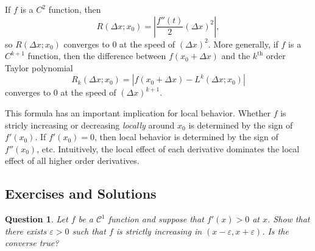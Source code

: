 \documentclass[11pt]{article}
\newtheorem{question}{Question}
\begin{document}
If \(f\) is a \(C^2\) function, then
\[
R(\Delta x; x_0) = \left|\frac{f''(t)}{2}(\Delta x)^2\right|,
\]
so \(R(\Delta x; x_0)\) converges to \(0\) at the speed of \((\Delta x)^2\). More generally, if \(f\) is a \(C^{k + 1}\) function, then the difference between \(f(x_0 + \Delta x)\) and the \(k^{\text{th}}\) order Taylor polynomial
\[
R_k(\Delta x; x_0) = |f(x_0 + \Delta x) - L^k(\Delta x; x_0)|
\]
converges to \(0\) at the speed of \((\Delta x)^{k + 1}\).

This formula has an important implication for local behavior. Whether \(f\) is stricly increasing or decreasing \emph{locally} around \(x_0\) is determined by the sign of \(f'(x_0)\). If \(f'(x_0) = 0\), then local behavior is determined by the sign of \(f''(x_0)\), etc. Intuitively, the local effect of each derivative dominates the local effect of all higher order derivatives.
\subsection{Exercises and Solutions}
\label{sec:org65560ec}
\begin{question}
Let $f$ be a $\mathcal{C}^1$ function and suppose that $f'(x) > 0$ at $x$. Show that there exists $\varepsilon > 0$ such that $f$ is strictly increasing in $(x - \varepsilon, x + \varepsilon)$. Is the converse true?
\end{question}
\end{document}
